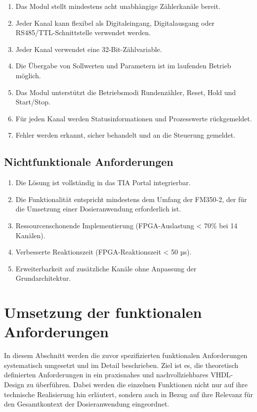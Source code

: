 \begin{enumerate}[label=F\arabic*]
    \item Das Modul stellt mindestens acht unabhängige Zählerkanäle bereit.
    \item Jeder Kanal kann flexibel als Digitaleingang, Digitalausgang oder RS485/TTL-Schnittstelle verwendet werden.
    \item Jeder Kanal verwendet eine 32-Bit-Zählvariable.
    \item Die Übergabe von Sollwerten und Parametern ist im laufenden Betrieb möglich.
    \item Das Modul unterstützt die Betriebsmodi Rundenzähler, Reset, Hold und Start/Stop.
    \item Für jeden Kanal werden Statusinformationen und Prozesswerte rückgemeldet.
    \item Fehler werden erkannt, sicher behandelt und an die Steuerung gemeldet.
\end{enumerate}

\subsection{Nichtfunktionale Anforderungen}

\begin{enumerate}[label=N\arabic*]
    \item Die Lösung ist vollständig in das TIA Portal integrierbar.
    \item Die Funktionalität entspricht mindestens dem Umfang der FM350-2, der für die Umsetzung einer Dosieranwendung erforderlich ist.
    \item Ressourcenschonende Implementierung (FPGA-Auslastung < 70\% bei 14 Kanälen).
    \item Verbesserte Reaktionszeit (FPGA-Reaktionszeit < 50 µs).
    \item Erweiterbarkeit auf zusätzliche Kanäle ohne Anpassung der Grundarchitektur.
\end{enumerate}

\section{Umsetzung der funktionalen Anforderungen}

In diesem Abschnitt werden die zuvor spezifizierten funktionalen Anforderungen systematisch umgesetzt und im Detail beschrieben.  
Ziel ist es, die theoretisch definierten Anforderungen in ein praxisnahes und nachvollziehbares VHDL-Design zu überführen. Dabei werden die einzelnen Funktionen nicht nur auf ihre technische Realisierung hin erläutert, sondern auch in Bezug auf ihre Relevanz für den Gesamtkontext der Dosieranwendung eingeordnet. 

